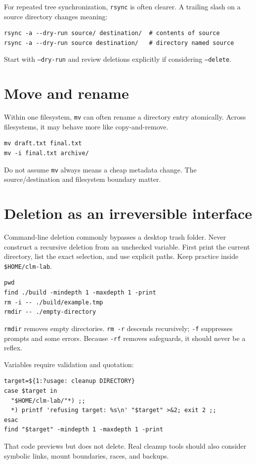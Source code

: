 \documentclass[11pt,oneside,openany]{book}
\begin{document}
For repeated tree synchronization, \texttt{rsync} is often clearer. A trailing slash on a source directory changes meaning:
\begin{lstlisting}
rsync -a --dry-run source/ destination/  # contents of source
rsync -a --dry-run source destination/   # directory named source
\end{lstlisting}
Start with \texttt{--dry-run} and review deletions explicitly if considering \texttt{--delete}.

\section{Move and rename}
Within one filesystem, \texttt{mv} can often rename a directory entry atomically. Across filesystems, it may behave more like copy-and-remove.
\begin{lstlisting}
mv draft.txt final.txt
mv -i final.txt archive/
\end{lstlisting}
Do not assume \texttt{mv} always means a cheap metadata change. The source/destination and filesystem boundary matter.

\section{Deletion as an irreversible interface}
\begin{warningbox}
Command-line deletion commonly bypasses a desktop trash folder. Never construct a recursive deletion from an unchecked variable. First print the current directory, list the exact selection, and use explicit paths. Keep practice inside \texttt{\$HOME/clm-lab}.
\end{warningbox}
\begin{lstlisting}
pwd
find ./build -mindepth 1 -maxdepth 1 -print
rm -i -- ./build/example.tmp
rmdir -- ./empty-directory
\end{lstlisting}
\texttt{rmdir} removes empty directories. \texttt{rm -r} descends recursively; \texttt{-f} suppresses prompts and some errors. Because \texttt{-rf} removes safeguards, it should never be a reflex.

Variables require validation and quotation:
\begin{lstlisting}
target=${1:?usage: cleanup DIRECTORY}
case $target in
  "$HOME/clm-lab/"*) ;;
  *) printf 'refusing target: %s\n' "$target" >&2; exit 2 ;;
esac
find "$target" -mindepth 1 -maxdepth 1 -print
\end{lstlisting}
That code previews but does not delete. Real cleanup tools should also consider symbolic links, mount boundaries, races, and backups.
\end{document}
